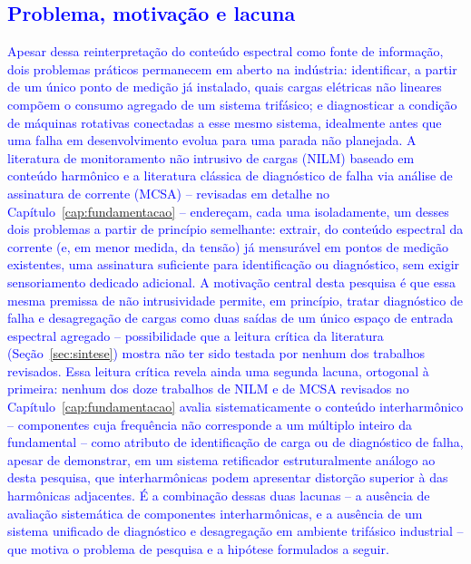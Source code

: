 \documentclass[times,final]{elsarticle}
\begin{document}
\textcolor{blue}{
\subsection{Problema, motivação e lacuna}
Apesar dessa reinterpretação do conteúdo espectral como fonte de informação, dois problemas práticos permanecem em aberto na indústria: identificar, a partir de um único ponto de medição já instalado, quais cargas elétricas não lineares compõem o consumo agregado de um sistema trifásico; e diagnosticar a condição de máquinas rotativas conectadas a esse mesmo sistema, idealmente antes que uma falha em desenvolvimento evolua para uma parada não planejada. A literatura de monitoramento não intrusivo de cargas (NILM) baseado em conteúdo harmônico e a literatura clássica de diagnóstico de falha via análise de assinatura de corrente (MCSA) -- revisadas em detalhe no Capítulo~\ref{cap:fundamentacao} -- endereçam, cada uma isoladamente, um desses dois problemas a partir de princípio semelhante: extrair, do conteúdo espectral da corrente (e, em menor medida, da tensão) já mensurável em pontos de medição existentes, uma assinatura suficiente para identificação ou diagnóstico, sem exigir sensoriamento dedicado adicional. A motivação central desta pesquisa é que essa mesma premissa de não intrusividade permite, em princípio, tratar diagnóstico de falha e desagregação de cargas como duas saídas de um único espaço de entrada espectral agregado -- possibilidade que a leitura crítica da literatura (Seção~\ref{sec:sintese}) mostra não ter sido testada por nenhum dos trabalhos revisados.
Essa leitura crítica revela ainda uma segunda lacuna, ortogonal à primeira: nenhum dos doze trabalhos de NILM e de MCSA revisados no Capítulo~\ref{cap:fundamentacao} avalia sistematicamente o conteúdo interharmônico -- componentes cuja frequência não corresponde a um múltiplo inteiro da fundamental \citep{efe2016} -- como atributo de identificação de carga ou de diagnóstico de falha, apesar de \citet{efe2016} demonstrar, em um sistema retificador estruturalmente análogo ao desta pesquisa, que interharmônicas podem apresentar distorção superior à das harmônicas adjacentes. É a combinação dessas duas lacunas -- a ausência de avaliação sistemática de componentes interharmônicas, e a ausência de um sistema unificado de diagnóstico e desagregação em ambiente trifásico industrial -- que motiva o problema de pesquisa e a hipótese formulados a seguir.

}
\end{document}
